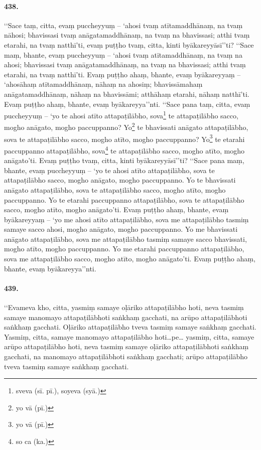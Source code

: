 \paragraph{438.} ‘‘Sace taṃ, citta, evaṃ puccheyyuṃ – ‘ahosi tvaṃ atītamaddhānaṃ, na tvaṃ nāhosi; bhavissasi tvaṃ anāgatamaddhānaṃ, na tvaṃ na bhavissasi; atthi tvaṃ etarahi, na tvaṃ natthī’ti, evaṃ puṭṭho tvaṃ, citta, kinti byākareyyāsī’’ti? ‘‘Sace maṃ, bhante, evaṃ puccheyyuṃ – ‘ahosi tvaṃ atītamaddhānaṃ, na tvaṃ na ahosi; bhavissasi tvaṃ anāgatamaddhānaṃ, na tvaṃ na bhavissasi; atthi tvaṃ etarahi, na tvaṃ natthī’ti. Evaṃ puṭṭho ahaṃ, bhante, evaṃ byākareyyaṃ – ‘ahosāhaṃ atītamaddhānaṃ, nāhaṃ na ahosiṃ; bhavissāmahaṃ anāgatamaddhānaṃ, nāhaṃ na bhavissāmi; atthāhaṃ etarahi, nāhaṃ natthī’ti. Evaṃ puṭṭho ahaṃ, bhante, evaṃ byākareyya’’nti. ‘‘Sace pana taṃ, citta, evaṃ puccheyyuṃ – ‘yo te ahosi atīto attapaṭilābho, sova\footnote{sveva (sī. pī.), soyeva (syā.)} te attapaṭilābho sacco, mogho anāgato, mogho paccuppanno? Yo\footnote{yo vā (pī.)} te bhavissati anāgato attapaṭilābho, sova te attapaṭilābho sacco, mogho atīto, mogho paccuppanno? Yo\footnote{yo vā (pī.)} te etarahi paccuppanno attapaṭilābho, sova\footnote{so ca (ka.)} te attapaṭilābho sacco, mogho atīto, mogho anāgato’ti. Evaṃ puṭṭho tvaṃ, citta, kinti byākareyyāsī’’ti? ‘‘Sace pana maṃ, bhante, evaṃ puccheyyuṃ – ‘yo te ahosi atīto attapaṭilābho, sova te attapaṭilābho sacco, mogho anāgato, mogho paccuppanno. Yo te bhavissati anāgato attapaṭilābho, sova te attapaṭilābho sacco, mogho atīto, mogho paccuppanno. Yo te etarahi paccuppanno attapaṭilābho, sova te attapaṭilābho sacco, mogho atīto, mogho anāgato’ti. Evaṃ puṭṭho ahaṃ, bhante, evaṃ byākareyyaṃ – ‘yo me ahosi atīto attapaṭilābho, sova me attapaṭilābho tasmiṃ samaye sacco ahosi, mogho anāgato, mogho paccuppanno. Yo me bhavissati anāgato attapaṭilābho, sova me attapaṭilābho tasmiṃ samaye sacco bhavissati, mogho atīto, mogho paccuppanno. Yo me etarahi paccuppanno attapaṭilābho, sova me attapaṭilābho sacco, mogho atīto, mogho anāgato’ti. Evaṃ puṭṭho ahaṃ, bhante, evaṃ byākareyya’’nti.

\paragraph{439.} ‘‘Evameva kho, citta, yasmiṃ samaye oḷāriko attapaṭilābho hoti, neva tasmiṃ samaye manomayo attapaṭilābhoti saṅkhaṃ gacchati, na arūpo attapaṭilābhoti saṅkhaṃ gacchati. Oḷāriko attapaṭilābho tveva tasmiṃ samaye saṅkhaṃ gacchati. Yasmiṃ, citta, samaye manomayo attapaṭilābho hoti…pe… yasmiṃ, citta, samaye arūpo attapaṭilābho hoti, neva tasmiṃ samaye oḷāriko attapaṭilābhoti saṅkhaṃ gacchati, na manomayo attapaṭilābhoti saṅkhaṃ gacchati; arūpo attapaṭilābho tveva tasmiṃ samaye saṅkhaṃ gacchati.

